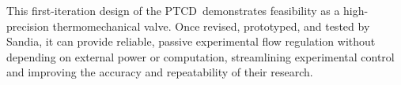 \documentclass[12pt, letterpaper]{report}%
\newcommand{\device}{PTCD}
\begin{document}
	This first-iteration design of the \device\ demonstrates feasibility as a high-precision thermomechanical valve. Once revised, prototyped, and tested by Sandia, it can provide reliable, passive experimental flow regulation without depending on external power or computation,
	streamlining experimental control and improving the accuracy and repeatability of their research.
\end{document}
